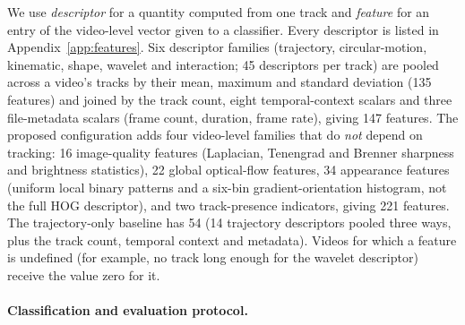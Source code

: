 \documentclass[runningheads]{llncs}
\begin{document}
We use \emph{descriptor} for a quantity computed from one track and \emph{feature} for an entry of the 
video-level vector given to a classifier. Every descriptor is listed in Appendix~\ref{app:features}. Six 
descriptor families (trajectory, circular-motion, kinematic, shape, wavelet and interaction; 45 descriptors 
per track) are pooled across a video's tracks by their mean, maximum and standard deviation (135 features) 
and joined by the track count, eight temporal-context scalars and three file-metadata scalars (frame count, 
duration, frame rate), giving 147 features. The proposed configuration adds four video-level families that 
do \emph{not} depend on tracking: 16 image-quality features (Laplacian, Tenengrad and Brenner sharpness and 
brightness statistics), 22 global optical-flow features, 34 appearance features (uniform local binary 
patterns and a six-bin gradient-orientation histogram, not the full HOG descriptor), and two track-presence 
indicators, giving 221 features. The trajectory-only baseline has 54 (14 trajectory descriptors pooled three 
ways, plus the track count, temporal context and metadata). Videos for which a feature is undefined (for 
example, no track long enough for the wavelet descriptor) receive the value zero for it.

\paragraph{Classification and evaluation protocol.}
\end{document}
